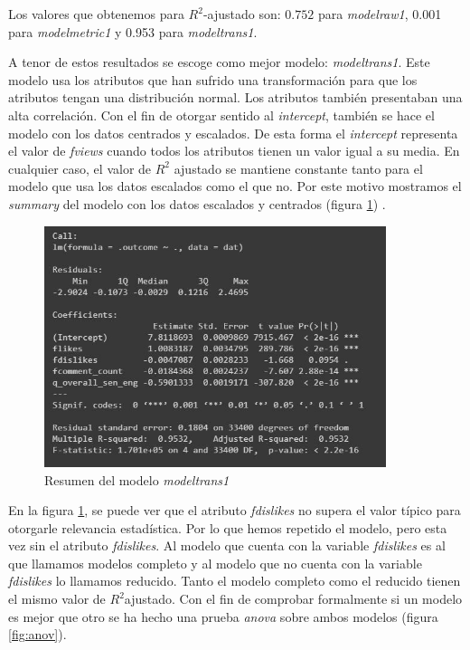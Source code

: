 \documentclass[a4paper,12pt]{article}
\begin{document}
Los valores que obtenemos para $R^{2}$-ajustado son: $0.752$ para {\itshape model{\textunderscore}raw{\textunderscore}1}, 0.001 para  {\itshape model{\textunderscore}metric{\textunderscore}1} y 0.953 para  {\itshape model{\textunderscore}trans{\textunderscore}1}.

A tenor de estos resultados se escoge como mejor modelo: {\itshape model{\textunderscore}trans{\textunderscore}1}. Este modelo usa los atributos que han sufrido una transformaci\'on para que los atributos tengan una distribuci\'on normal. Los atributos tambi\'en presentaban una alta correlaci\'on. Con el fin de otorgar sentido al {\itshape intercept}, tambi\'en se hace el modelo con los datos centrados y escalados. De esta forma el {\itshape intercept} representa el valor de {\itshape fviews} cuando todos los atributos tienen un valor igual a su media. En cualquier caso, el valor de $R^{2}$ ajustado se mantiene constante tanto para el modelo que usa los datos escalados como el que no. Por este motivo mostramos el {\itshape summary} del modelo con los datos escalados y centrados (figura \ref{fig:summ}) .

\begin{figure}[h!]
\centering
\includegraphics[width=10cm]{summa.JPG}
\caption{Resumen del modelo {\itshape model{\textunderscore}trans{\textunderscore}1}}
\label{fig:summ}
\end{figure}


En la figura  \ref{fig:summ}, se puede ver que el atributo {\itshape fdislikes} no supera el valor t\'ipico para otorgarle relevancia estad\'istica. Por lo que hemos repetido el modelo, pero esta vez sin el atributo {\itshape fdislikes}. Al modelo que cuenta con la variable {\itshape fdislikes} es al que llamamos modelos completo y al modelo que no cuenta con la variable {\itshape fdislikes} lo llamamos reducido. Tanto el modelo completo como el reducido tienen el mismo valor de $R^{2}$ajustado. Con el fin de comprobar formalmente si un modelo es mejor que otro se ha hecho una prueba {\itshape anova} sobre ambos modelos (figura \ref{fig:anov}).
\end{document}
